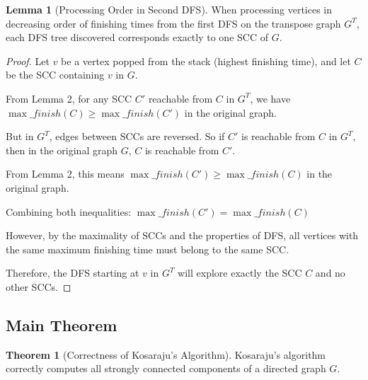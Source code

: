 \documentclass{book}
\theoremstyle{definition}
\newtheorem{lemma}[definition]{Lemma}
\newtheorem{theorem}[definition]{Theorem}
\begin{document}
\begin{lemma}[Processing Order in Second DFS]
When processing vertices in decreasing order of finishing times from the first DFS on the transpose graph $G^T$, each DFS tree discovered corresponds exactly to one SCC of $G$.
\end{lemma}

\begin{proof}
Let $v$ be a vertex popped from the stack (highest finishing time), and let $C$ be the SCC containing $v$ in $G$.

From Lemma 2, for any SCC $C'$ reachable from $C$ in $G^T$, we have $\max\_finish(C) \geq \max\_finish(C')$ in the original graph.

But in $G^T$, edges between SCCs are reversed. So if $C'$ is reachable from $C$ in $G^T$, then in the original graph $G$, $C$ is reachable from $C'$.

From Lemma 2, this means $\max\_finish(C') \geq \max\_finish(C)$ in the original graph.

Combining both inequalities: $\max\_finish(C') = \max\_finish(C)$

However, by the maximality of SCCs and the properties of DFS, all vertices with the same maximum finishing time must belong to the same SCC.

Therefore, the DFS starting at $v$ in $G^T$ will explore exactly the SCC $C$ and no other SCCs.
\end{proof}

\subsection{Main Theorem}

\begin{theorem}[Correctness of Kosaraju's Algorithm]
Kosaraju's algorithm correctly computes all strongly connected components of a directed graph $G$.
\end{theorem}
\end{document}
